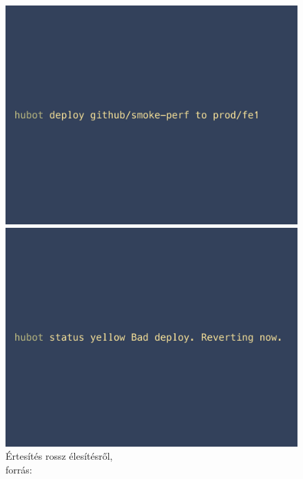 \begin{figure}[ht]
  \centering
  \begin{minipage}{.45\textwidth}
    \centering
    \includegraphics[scale=0.90]{assets/hubot_deploy.jpg}%
    \caption[DUMMY]%
    {Élesítés robot segítségével,\\forrás: \cite[p.~40]{what_is_chatops_slideshow}}%
    \label{fig:hubot_deploy}
  \end{minipage}\hfill
  \begin{minipage}{.45\textwidth}
    \centering
    \includegraphics[scale=0.90]{assets/hubot_status.jpg}%
    \caption[DUMMY]%
    {Értesítés rossz élesítésről,\\forrás: \cite[p.~48]{what_is_chatops_slideshow}}%
    \label{fig:hubot_status}
  \end{minipage}\hfill
\end{figure}

